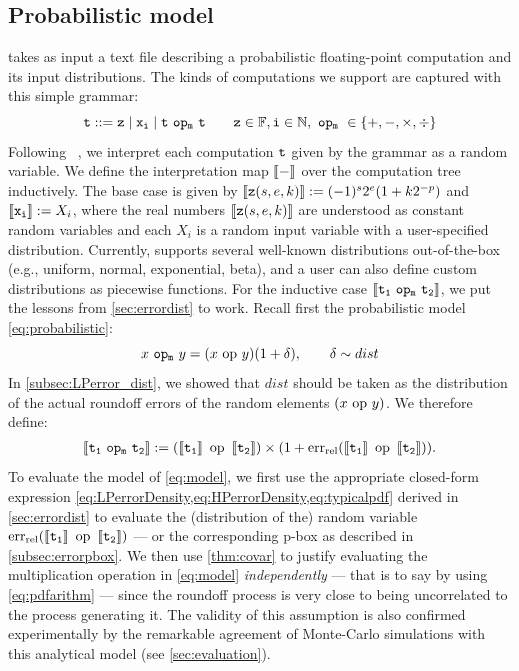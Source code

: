 \subsection{Probabilistic model}\label{subsec:model}
\Tool takes as input a text file describing a probabilistic floating-point
computation and its input distributions.
%
The kinds of computations we support are captured with this simple grammar:
\[
\tt t::= z \mid x_i \mid t~\mathtt{op_m}~ t \qquad \mathtt{z}\in\mathbb{F}, \mathtt{i}\in\mathbb{N}, ~\mathtt{op_m}~\in\{+,-,\times,\div\}
\]
Following ~\cite{K81c}, we interpret each computation $\tt  t$ given by the grammar as a random variable.
%
We define the interpretation map $\left\llbracket-\right\rrbracket$ over the computation tree inductively.
%
The base case is given by
$\left\llbracket\mathtt{z}(s,e,k)\right\rrbracket \mathrel{:=} (-1)^s2^e(1+k2^{-p})$ and $\left\llbracket\mathtt{x_i}\right\rrbracket \mathrel{:=} X_i$,
where the real numbers $\left\llbracket\mathtt{z}(s,e,k)\right\rrbracket$ are understood as constant random variables and each $X_i$ is a random input variable
with a user-specified distribution.
%
Currently, \Tool supports several well-known distributions out-of-the-box (e.g., uniform, normal, exponential, beta), and a user can also define custom distributions as piecewise functions.
%
For the inductive case $\left\llbracket\tt t_1~\mathtt{op_m}~ t_2\right\rrbracket$, we put the lessons from \cref{sec:errordist} to work.
Recall first the probabilistic model \cref{eq:probabilistic}:
\[
x~\mathtt{op_m}~ y=(x~\mathrm{op}~ y)(1+\delta), \qquad\delta\sim dist
\]
%
%
In \cref{subsec:LPerror_dist}, we showed that $dist$ should be taken as the distribution of the actual roundoff errors of the random elements $(x~\mathrm{op}~ y)$.  We therefore define:
\begin{align}
\left\llbracket\mathtt{t_1 ~\mathtt{op_m}~ t_2}\right\rrbracket\mathrel{:=}(\left\llbracket\mathtt{t_1}\right\rrbracket~\mathrm{op}~\left\llbracket\mathtt{t_2}\right\rrbracket)\times (1+ \mathrm{err}_{\mathrm{rel}}(\mathtt{\left\llbracket t_1\right\rrbracket~\mathrm{op}~\left\llbracket\tt t_2\right\rrbracket)}).\label{eq:model}
\end{align}
To evaluate the model of \cref{eq:model}, we first use the appropriate closed-form expression \cref{eq:LPerrorDensity,eq:HPerrorDensity,eq:typicalpdf}  derived in \cref{sec:errordist} to evaluate the (distribution of the) random variable $\mathrm{err}_{\mathrm{rel}}(\mathtt{\left\llbracket t_1\right\rrbracket~\mathrm{op}~\left\llbracket\tt t_2\right\rrbracket)}$ --- or the corresponding p-box as described in \cref{subsec:errorpbox}. We then use \cref{thm:covar} to justify evaluating the multiplication operation in \cref{eq:model} \emph{independently} --- that is to say by using \cref{eq:pdfarithm} --- since the roundoff process is very close to being uncorrelated to the process generating it. The validity of this assumption is also confirmed experimentally by the remarkable agreement of Monte-Carlo simulations with this analytical model (see \cref{sec:evaluation}).


